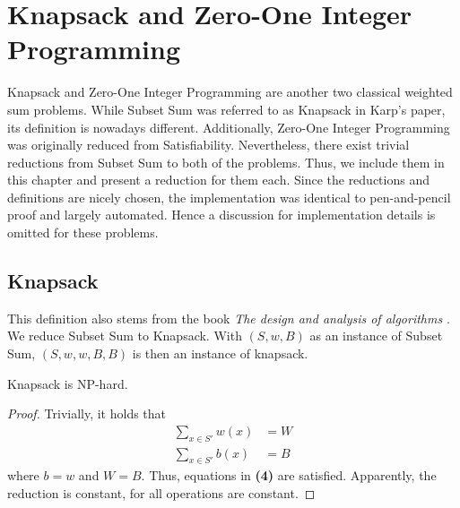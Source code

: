 \section{Knapsack and Zero-One Integer Programming}
Knapsack and Zero-One Integer Programming are another two classical weighted sum problems. While Subset Sum was referred 
to as Knapsack in Karp's paper, its definition is nowadays different. Additionally, Zero-One Integer Programming 
was originally reduced from Satisfiability. Nevertheless, there exist trivial reductions from Subset Sum to both of the problems. Thus, 
we include them in this chapter and present a reduction for them each. 
Since the reductions and definitions are nicely chosen, the implementation was identical to pen-and-pencil proof 
and largely automated. Hence a discussion for implementation details is omitted for these problems.

\subsection{Knapsack}
This definition also stems from the book \textit{The design and analysis of algorithms} \cite{kozen1992design}. 
We reduce Subset Sum to Knapsack. With $(S, w, B)$ as an instance of Subset Sum, $(S, w, w, B, B)$
is then an instance of knapsack.
\begin{theorem}
    Knapsack is NP-hard.
\end{theorem}
\begin{proof}
    Trivially, it holds that 
    \begin{align*}
        \sum_{x \in S'} w(x) &= W \\ 
        \sum_{x \in S'} b(x) &= B
    \end{align*}
    where $b = w$ and $W = B$. Thus, equations in \textbf{(4)} are satisfied.
    Apparently, the reduction is constant, for all operations are constant. 
\end{proof}

